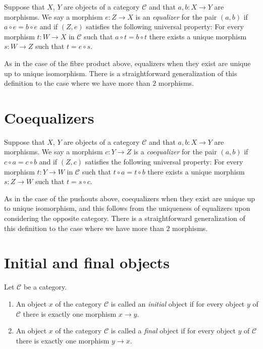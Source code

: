 \begin{definition}
\label{definition-equalizers}
Suppose that $X$, $Y$ are objects of a category $\mathcal{C}$
and that $a, b : X \to Y$ are morphisms. We say a morphism
$e : Z \to X$ is an {\it equalizer} for the pair $(a, b)$ if
$a \circ e = b \circ e$ and if $(Z, e)$ satisfies the following
universal property: For every morphism $t : W \to X$
in $\mathcal{C}$ such that $a \circ t = b \circ t$ there exists
a unique morphism $s : W \to Z$ such that $t = e \circ s$.
\end{definition}

\noindent
As in the case of the fibre product above, equalizers when
they exist are unique up to unique isomorphism. There is a
straightforward generalization of this definition to the
case where we have more than $2$ morphisms.

\section{Coequalizers}
\label{section-coequalizers}

\begin{definition}
\label{definition-coequalizers}
Suppose that $X$, $Y$ are objects of a category $\mathcal{C}$
and that $a, b : X \to Y$ are morphisms. We say a morphism
$c : Y \to Z$ is a {\it coequalizer} for the pair $(a, b)$ if
$c \circ a = c \circ b$ and if $(Z, c)$ satisfies the following
universal property: For every morphism $t : Y \to W$
in $\mathcal{C}$ such that $t \circ a = t \circ b$ there exists
a unique morphism $s : Z \to W$ such that $t = s \circ c$.
\end{definition}

\noindent
As in the case of the pushouts above, coequalizers when
they exist are unique up to unique isomorphism, and this follows
from the uniqueness of equalizers upon considering the opposite
category. There is a straightforward generalization of this definition
to the case where we have more than $2$ morphisms.

\section{Initial and final objects}
\label{section-initial-final}

\begin{definition}
\label{definition-initial-final}
Let $\mathcal{C}$ be a category.
\begin{enumerate}
\item An object $x$ of the category $\mathcal{C}$ is called
an {\it initial} object if for every object $y$ of $\mathcal{C}$
there is exactly one morphism $x \to y$.
\item An object $x$ of the category $\mathcal{C}$ is called
a {\it final} object if for every object $y$ of $\mathcal{C}$
there is exactly one morphism $y \to x$.
\end{enumerate}
\end{definition}


